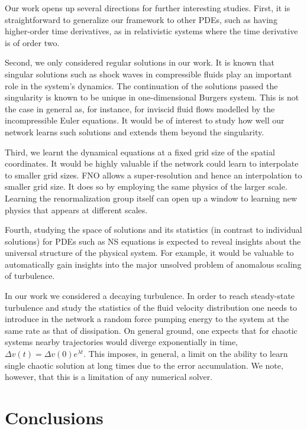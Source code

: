 \documentclass{article}
\theoremstyle{plain}
\theoremstyle{definition}
\theoremstyle{remark}
\begin{document}
Our work opens up several directions for further interesting  studies. First, it is straightforward to generalize our framework to other PDEs, such as having higher-order time derivatives, as in relativistic systems where
the time derivative is of order two.

Second, we only considered regular solutions in our work. It is known that singular solutions such as shock waves
in compressible fluids play an important role in the system's dynamics. 
The continuation of the solutions passed the singularity is known to be unique in one-dimensional Burgers
system. This is not the case in general as, for instance, for inviscid fluid flows modelled
by the incompressible Euler equations. It would be of interest to study how well our network learns such solutions and extends them beyond the singularity. 

Third, we learnt the dynamical equations at a fixed grid size of the spatial coordinates. It would be highly valuable if the network could learn to interpolate to smaller grid sizes.  FNO allows a super-resolution and hence an interpolation to smaller grid size. It does so by employing the same physics of the larger scale.
Learning the renormalization group itself can open up a window to learning new physics that appears at different scales. 

Fourth, studying the space of solutions and its statistics (in contrast to individual solutions) for PDEs such as NS equations is expected to reveal insights about the universal structure of the physical system. For example, it would be valuable to automatically gain insights into the major unsolved problem of anomalous scaling of turbulence. 

In our work we considered a decaying turbulence. In order to reach steady-state turbulence and study the 
statistics of the fluid velocity distribution one needs to introduce in the network a random force pumping energy to the system at the same rate as that of dissipation.
On general ground, one expects that for chaotic systems nearby trajectories would diverge exponentially in time,
$\Delta v(t) = \Delta v(0) e^{\lambda t}$.
This imposes, in general, a limit on the ability to learn single chaotic solution at long times
due to the error accumulation. We note, however, that this is a limitation 
of any numerical solver.



\section{Conclusions}
\end{document}
